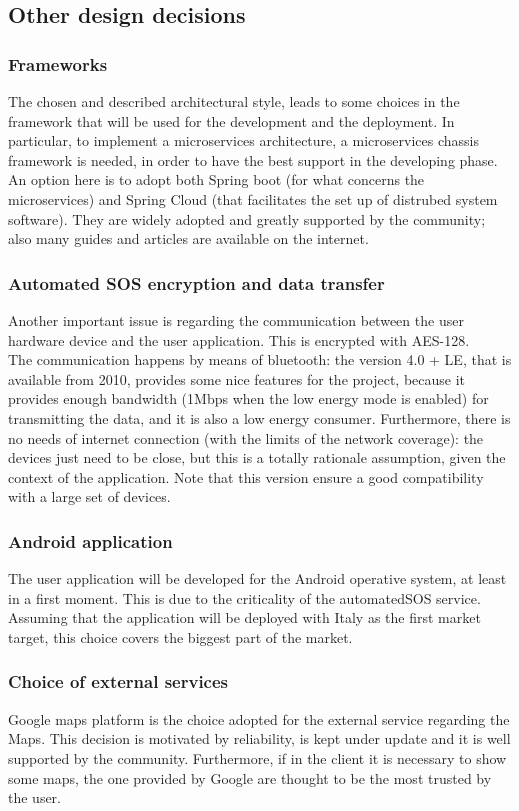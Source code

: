\subsection{Other design decisions}
\subsubsection{Frameworks}
The chosen and described architectural style, leads to some choices in the framework that will be used for the development and the deployment. 
In particular, to implement a microservices architecture, a microservices chassis framework is needed, in order to have the best support 
in the developing phase. 
An option here is to adopt both Spring boot (for what concerns the microservices) and Spring Cloud (that facilitates the set up of distrubed
system software). They are widely adopted and greatly supported by the community; also many guides and articles are available on the internet. 

\subsubsection{Automated SOS encryption and data transfer}
Another important issue is regarding the communication between the user hardware device and the user application. This is encrypted with
AES-128. \\
The communication happens by means of bluetooth: the version 4.0 + LE, that is available from 2010, provides some nice features for the
project, because it provides enough  bandwidth (1Mbps when the low energy mode is enabled) for transmitting the data, and it is also a low
energy consumer. Furthermore, there is no needs of internet connection (with the limits of the network coverage): the devices just need to be
close, but this is a totally rationale assumption, given the context of the application. 
Note that this version ensure a good compatibility with a large set of devices. 

\subsubsection{Android application} 	 
The user application will be developed for the Android operative system, at least in a first moment. This is due to the criticality of the
automatedSOS service. Assuming that the application will be deployed with Italy as the first market target, this choice covers the biggest
part of the market.

\subsubsection{Choice of external services}
Google maps platform is the choice adopted for the external service regarding the Maps. This decision is motivated by reliability, 
is kept under update and it is well supported by the community. Furthermore, if in the client it is necessary to show some maps, the one
provided by Google are thought to be the most trusted by the user. 
